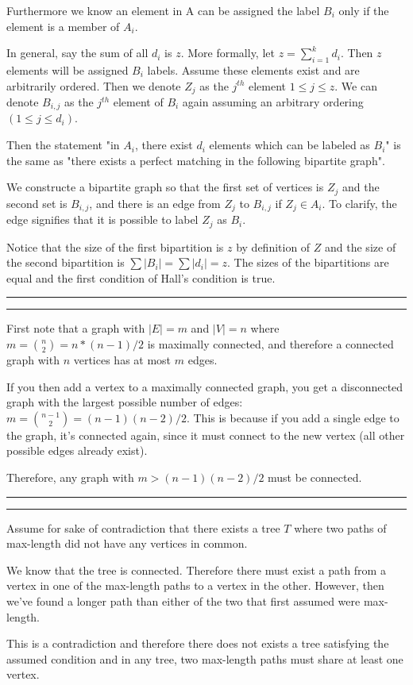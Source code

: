 \documentclass[11pt,letterpaper]{article}
\newcommand{\question}[1] {\vspace{.25in} \hrule\vspace{0.5em}
\noindent{\bf #1} \vspace{0.5em}
\hrule \vspace{.10in}}
\begin{document}
Furthermore we know an element in A can be assigned the label $B_i$ only if the element is a member of $A_i$.

In general, say the sum of all $d_i$ is $z$. More formally, let $z = \sum_{i=1}^k d_i$. Then $z$ elements will be assigned $B_i$ labels. Assume these elements exist and are arbitrarily ordered. Then we denote $Z_j$ as the $j^{th}$ element $1\leq j \leq z$.
We can denote $B_{i,j}$ as the $j^{th}$ element of $B_i$ again assuming an arbitrary ordering $(1 \leq j \leq d_i)$.

Then the statement "in $A_i$, there exist $d_i$ elements which can be labeled as $B_i$" is the same as "there exists a perfect matching in the following bipartite graph".

We constructe a bipartite graph so that the first set of vertices is
$Z_j$ and the second set is $B_{i,j}$, and there is an edge from $Z_j$ to $B_{i,j}$ if $Z_j \in A_i$.
To clarify, the edge signifies that it is possible to label $Z_j$ as $B_i$.

Notice that the size of the first bipartition is $z$ by definition of $Z$ and the size of the second bipartition is $\sum |B_i| = \sum |d_i| = z$.
The sizes of the bipartitions are equal and the first condition of Hall's condition is true.



\question{3}
First note that a graph with $|E| = m$ and $|V| = n$ where $m = {n \choose 2} = n*(n - 1)/2$ is maximally connected, and therefore a connected graph with $n$ vertices has at most $m$ edges.

If you then add a vertex to a maximally connected graph, you get a disconnected graph with the largest possible number of edges: $m = {n-1 \choose 2} = (n-1)(n-2)/2$.
This is because if you add a single edge to the graph, it's connected again, since it must connect to the new vertex (all other possible edges already exist).

Therefore, any graph with $m > (n-1)(n-2)/2$ must be connected.

\question{4}
Assume for sake of contradiction that there exists a tree $T$ where two paths of max-length did not have any vertices in common.

We know that the tree is connected.
Therefore there must exist a path from a vertex in one of the max-length paths to a vertex in the other.
However, then we've found a longer path than either of the two that first assumed were max-length.

This is a contradiction and therefore there does not exists a tree satisfying the assumed condition and in any tree, two max-length paths must share at least one vertex.
\end{document}
